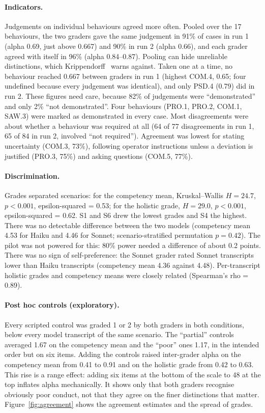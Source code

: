 \documentclass[11pt]{article}
\begin{document}
\paragraph{Indicators.} Judgements on individual behaviours agreed more often. Pooled over the 17 behaviours, the two graders gave the same judgement in 91\% of cases in run 1 (alpha 0.69, just above 0.667) and 90\% in run 2 (alpha 0.66), and each grader agreed with itself in 96\% (alpha 0.84--0.87). Pooling can hide unreliable distinctions, which Krippendorff~\cite[``Recommendations'']{krippendorff2004} warns against. Taken one at a time, no behaviour reached 0.667 between graders in run 1 (highest COM.4, 0.65; four undefined because every judgement was identical), and only PSD.4 (0.79) did in run 2. These figures need care, because 82\% of judgements were ``demonstrated'' and only 2\% ``not demonstrated''. Four behaviours (PRO.1, PRO.2, COM.1, SAW.3) were marked as demonstrated in every case. Most disagreements were about whether a behaviour was required at all (64 of 77 disagreements in run 1, 65 of 84 in run 2, involved ``not required''). Agreement was lowest for stating uncertainty (COM.3, 73\%), following operator instructions unless a deviation is justified (PRO.3, 75\%) and asking questions (COM.5, 77\%).

\paragraph{Discrimination.} Grades separated scenarios: for the competency mean, Kruskal--Wallis $H = 24.7$, $p < 0.001$, epsilon-squared = 0.53; for the holistic grade, $H = 29.0$, $p < 0.001$, epsilon-squared = 0.62. S1 and S6 drew the lowest grades and S4 the highest. There was no detectable difference between the two models (competency mean 4.53 for Haiku and 4.46 for Sonnet; scenario-stratified permutation $p = 0.42$). The pilot was not powered for this: 80\% power needed a difference of about 0.2 points. There was no sign of self-preference: the Sonnet grader rated Sonnet transcripts lower than Haiku transcripts (competency mean 4.36 against 4.48). Per-transcript holistic grades and competency means were closely related (Spearman's rho = 0.89).

\paragraph{Post hoc controls (exploratory).} Every scripted control was graded 1 or 2 by both graders in both conditions, below every model transcript of the same scenario. The ``partial'' controls averaged 1.67 on the competency mean and the ``poor'' ones 1.17, in the intended order but on six items. Adding the controls raised inter-grader alpha on the competency mean from 0.41 to 0.91 and on the holistic grade from 0.42 to 0.63. This rise is a range effect: adding six items at the bottom of the scale to 48 at the top inflates alpha mechanically. It shows only that both graders recognise obviously poor conduct, not that they agree on the finer distinctions that matter. Figure~\ref{fig:agreement} shows the agreement estimates and the spread of grades.
\end{document}
